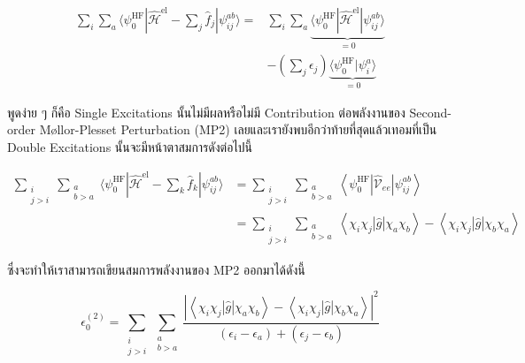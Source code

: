 \begin{equation}
    \begin{aligned}
        \sum_{i} \sum_{a} 
        \langle\psi_{0}^{\mathrm{HF}} | \hat{\mathscr{H}}^{\mathrm{el}} 
        - \sum_{j} \hat{f}_{j} | \psi_{i j}^{a b}\rangle 
        = & \sum_{i} \sum_{a} 
            \underbrace{\langle\psi_{0}^{\mathrm{HF}} 
                | \hat{\mathscr{H}}^{\mathrm{el}} | 
                \psi_{i j}^{a b}\rangle}_
            {= 0} \\
        & - \left( \sum_{j} \epsilon_{j} \right) 
        \underbrace{\langle\psi_{0}^{\mathrm{HF}} | \psi_{i}^{a} \rangle}_{= 0}
    \end{aligned}
\end{equation}

\noindent พูดง่าย ๆ ก็คือ Single Excitations นั้นไม่มีผลหรือไม่มี Contribution ต่อพลังงานของ Second-order M\o{}llor-Plesset 
Perturbation (MP2) เลยและเรายังพบอีกว่าท้ายที่สุดแล้วเทอมที่เป็น Double Excitations นั้นจะมีหน้าตาสมการดังต่อไปนี้ 

\begin{equation}
    \begin{aligned}
        \sum_{\substack{i \\ j>i}} \sum_{\substack{a \\ b>a}} 
            \langle\psi_{0}^{\mathrm{HF}} | \hat{\mathscr{H}}^{\mathrm{el}} 
            - \sum_{k} \hat{f}_{k} | \psi_{i j}^{a b}\rangle & 
        = \sum_{\substack{i \\ j>i}} \sum_{\substack{a \\ b>a}} 
            \left\langle\psi_{0}^{\mathrm{HF}} 
                \left|\hat{\mathcal{V}}_{e e}\right| 
                \psi_{i j}^{a b}\right\rangle \\
        & =\sum_{\substack{i \\ j>i}} \sum_{\substack{a \\ b>a}} 
            \left\langle\chi_{i} \chi_{j}|\hat{g}| \chi_{a} \chi_{b}\right\rangle 
            - \left\langle\chi_{i} \chi_{j}|\hat{g}| \chi_{b} \chi_{a}\right\rangle
    \end{aligned}
\end{equation}

\noindent ซึ่งจะทำให้เราสามารถเขียนสมการพลังงานของ MP2 ออกมาได้ดังนี้

\begin{equation}
    \epsilon^{(2)}_{0} 
    = 
    \sum_{\substack{i \\ j>i}} \sum_{\substack{a \\ b>a}} 
        \frac{\left| \left\langle \chi_{i}\chi_{j} | \hat{g} | \chi_{a}\chi_{b} \right\rangle
            - \left\langle \chi_{i}\chi_{j} | \hat{g} | \chi_{b}\chi_{a} \right\rangle \right|^{2}}
            {(\epsilon_{i} - \epsilon_{a}) + (\epsilon_{j} - \epsilon_{b})}
\end{equation}

